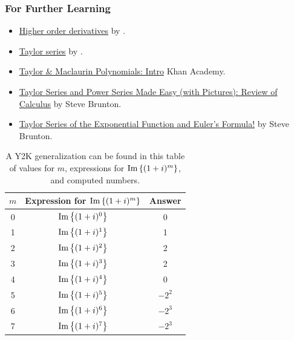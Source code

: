 \subsubsection{For Further Learning}
\begin{itemize}
\item \href{https://youtu.be/BLkz5LGWihw}{Higher order derivatives} by \threebb.

    \item \href{https://youtu.be/3d6DsjIBzJ4}{Taylor series}  by \threebb.

    \item \href{https://www.youtube.com/watch?v=epgwuzzDHsQ}{Taylor \& Maclaurin Polynomials: Intro} Khan Academy.

    \item \href{https://www.youtube.com/watch?v=ebfOSDj4j3I}{Taylor Series and Power Series Made Easy (with Pictures): Review of Calculus} by Steve Brunton.

    \item \href{https://youtu.be/H0Zbg_CqMCs}{Taylor Series of the Exponential Function and Euler's Formula!} by Steve Brunton.
\end{itemize}



\begin{table}[ht]
\centering
\begin{tabular}{|c|c|c|}
\hline
\( m \) & Expression for \( {\rm Im} \left\{  (1 + i)^m\right\} \) & Answer \\
\hline
0 & \( {\rm Im} \left\{  (1 + i)^{0}\right\} \) & 0 \\
1 & \( {\rm Im} \left\{  (1 + i)^1\right\} \) & 1 \\
2 & \( {\rm Im} \left\{  (1 + i)^2\right\} \) & 2 \\
3& \( {\rm Im} \left\{  (1 + i)^3\right\} \) & 2 \\
4 & \( {\rm Im} \left\{  (1 + i)^4\right\} \) & 0 \\
5 & \( {\rm Im} \left\{  (1 + i)^5\right\} \) & $-2^2$ \\
6& \( {\rm Im} \left\{  (1 + i)^6\right\} \) & $-2^3$\\
7& \( {\rm Im} \left\{  (1 + i)^7\right\} \) & $-2^3$ \\
\hline
\end{tabular}
\caption{A Y2K generalization can be found in this table of values for \( m \), expressions for \( {\rm Im} \left\{  (1 + i)^m\right\} \), and computed numbers.}
\end{table}

